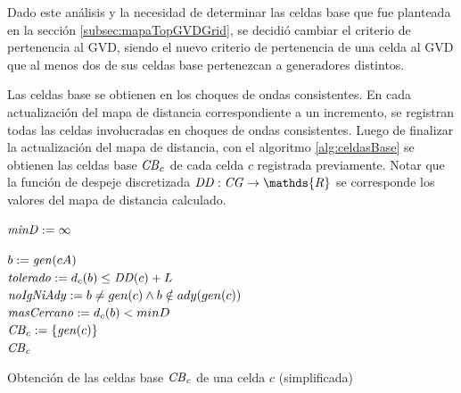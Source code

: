Dado este análisis y la necesidad de determinar las celdas base que fue
planteada en la sección \ref{subsec:mapaTopGVDGrid}, se decidió cambiar el
criterio de pertenencia al GVD, siendo el nuevo criterio de pertenencia de una
celda al GVD que al menos dos de sus celdas base pertenezcan a generadores
distintos.

Las celdas base se obtienen en los choques de ondas consistentes. En cada
actualización del mapa de distancia correspondiente a un incremento, se
registran todas las celdas involucradas en choques de ondas consistentes.
Luego de finalizar la actualización del mapa de distancia, con el algoritmo
\ref{alg:celdasBase} se obtienen las celdas base $\mathit{CB}_c$ de cada celda $c$
registrada previamente. Notar que la función de despeje discretizada $\mli{DD}
: \mli{CG} \rightarrow \mathds{R}$ se corresponde los valores del mapa de
distancia calculado.

\begin{algorithm}[H]
\SetAlgoLined


  $\mathit{minD} := \infty$

   {
    $b := \mathit{gen}(cA)$\\
    $\mathit{tolerado} := d_c(b) \leq \mathit{DD}(c) + L$\\
    $\mathit{noIgNiAdy} := b \neq gen(c) \land b \notin ady(gen(c))$\\
    $\mathit{masCercano} := d_c(b) < minD$\\
  }
  $\mathit{CB}_c := \{\mathit{gen}(c)\}$\\
  \Return $\mathit{CB}_c$ 

  \caption{Obtención de las celdas base $\mathit{CB}_c$ de una celda $c$ (simplificada)}
  \label{alg:celdasBase}
\end{algorithm}

